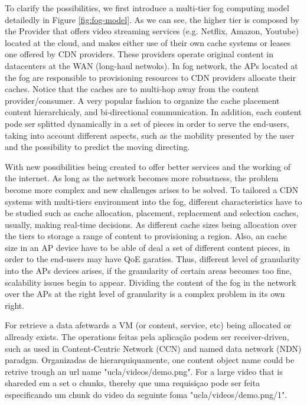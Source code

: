 To clarify the possibilities, we first introduce a multi-tier fog computing model detailedly in Figure \ref{fig:fog-model}. As we can see, the higher tier is composed by the Provider that offers video streaming services (e.g. Netflix, Amazon, Youtube) located at the cloud, and makes either use of their own cache systems or leases one offered by CDN providers. %
These providers operate original content in datacenters at the WAN (long-haul netwoks). In fog network, the APs located at the fog are responsible to provisioning resources to CDN providers allocate their caches. Notice that the caches are to multi-hop away from the content provider/consumer. A very popular fashion to organize the cache placement content hierarchicaly, and bi-directional communication. In addition, each content pode ser splitted dynamically in a set of pieces in order to serve the end-users, taking into account different aspects, such as the mobility presented by the user and the possibility to predict the moving directing. 

With new possibilities being created to offer better services and the working of the internet. As long as the network becomes more robustness, the problem become more complex and new challenges arises to be solved. To tailored a CDN systems with multi-tiers environment into the fog, different characteristics have to be studied such as cache allocation, placement, replacement and selection caches, usually, making real-time decisions. As different cache sizes being allocation over the tiers to storage a range of content to provisioning a region. Also, an cache size in an AP device have to be able of deal a set of different content pieces, in order to the end-users may have QoE garaties. Thus, different level of granularity into the APs devices arises, if the granularity of certain areas becomes too fine, scalability issues begin to appear. Dividing the content of the fog in the network over the APs at the right level of granularity is a complex problem in its own right.
 

For retrieve a data afetwards a VM (or content, service, etc) being allocated or allready exists. The operations feitas pela aplicação podem ser receiver-driven, such as used in Content-Centric Network (CCN) and named data network (NDN) paradgm. 
Organizadas de hierarquiquamente, one content object name could be retrive trough an url name "ucla/videos/demo.png". For a large video that is shareded em a set o chunks, thereby  que uma requisiçao pode ser feita especificando um chunk do video  da seguinte foma "ucla/videos/demo.png/1".

